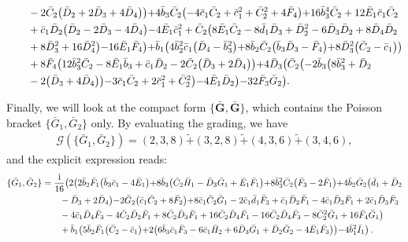 \documentclass[10pt]{amsart}
\theoremstyle{definition}
\theoremstyle{corollary}
\theoremstyle{remark}
\theoremstyle{conclusion}
\begin{document}
\begin{align}
& \hskip 0.7cm -2 \bar{C}_2 \bigl(\bar{D}_2+2 \bar{D}_3+4 \bar{D}_4\bigl)\bigl)+4 \bar{b}_3 \bar{C}_2 \bigl(-4 \bar{c}_1 \bar{C}_2+\bar{c}_1^2+\bar{C}_2^2+4 \bar{F}_4\bigl)+16 \bar{b}_3^4 \bar{C}_2+12 \bar{E}_1 \bar{c}_1 \bar{C}_2 \nonumber\\
& \hskip 0.7cm+\bar{c}_1 \bar{D}_2 \bigl(\bar{D}_2-2 \bar{D}_3-4 \bar{D}_4\bigl)-4 \bar{E}_1 \bar{c}_1^2+\bar{C}_2 \bigl(8 \bar{E}_1 \bar{C}_2-8 \bar{d}_1 \bar{D}_3+\bar{D}_2^2-6 \bar{D}_3 \bar{D}_2+8 \bar{D}_4 \bar{D}_2 \nonumber\\
& \hskip 0.7cm+8 \bar{D}_3^2+16 \bar{D}_4^2\bigl)-16 \bar{E}_1 \bar{F}_4\bigl)+\bar{b}_1 \bigl(4 \bar{b}_2^2 \bar{c}_1 \bigl(\bar{D}_4-\bar{b}_3^2\bigl)+8 \bar{b}_2 \bar{C}_2 \bigl(\bar{b}_3 \bar{D}_3-\bar{F}_4\bigl)+8 \bar{D}_3^2 \bigl(\bar{C}_2-\bar{c}_1\bigl)\bigl) \nonumber\\
& \hskip 0.7cm+8 \bar{F}_4 \bigl(12 \bar{b}_3^2 \bar{C}_2-8 \bar{E}_1 \bar{b}_3+\bar{c}_1 \bar{D}_2-2 \bar{C}_2 \bigl(\bar{D}_3+2 \bar{D}_4\bigl)\bigl)+4 \bar{D}_3 \bigl(\bar{C}_2 \bigl(-2 \bar{b}_3 \bigl(8 \bar{b}_3^2+\bar{D}_2  \nonumber\\
& \hskip 0.7cm-2 \bigl(\bar{D}_3+4 \bar{D}_4\bigl)\bigl)-3 \bar{c}_1\bar{C}_2+2 \bar{c}_1^2+\bar{C}_2^2\bigl)-4 \bar{E}_1 \bar{D}_2\bigl)-32 \bar{F}_3 \bar{G}_2\bigl) .
\end{align}


Finally, we will look at the compact form $\{\bar{\textbf{G}},\bar{\textbf{G}}\}$, which contains the Poisson bracket $\{\bar{G}_1,\bar{G}_2\}$ only. By evaluating the grading, we have
 \begin{align*}
    \mathcal{G} \left(\{\bar{G}_1,\bar{G}_2\}\right) = (2,3,8) \tilde{+}(3,2,8) \tilde{+}(4,3,6) \tilde{+}(3,4,6) ,
\end{align*} 
 and the explicit expression reads:
\begin{align}
\{\bar{G}_1,\bar{G}_2\}&=\frac{{\rm i}}{16}  \bigl(2 \bigl(2 \bar{b}_2 \bar{F}_1 \bigl(\bar{b}_3 \bar{c}_1-4 \bar{E}_1\bigl)+8 \bar{b}_3 \bigl(\bar{C}_2 \bar{H}_1-\bar{D}_3 \bar{G}_1+\bar{E}_1 \bar{F}_1\bigl)+8 \bar{b}_3^2 \bar{C}_2 \bigl(\bar{F}_3-2 \bar{F}_1\bigl)+4 \bar{b}_2 \bar{G}_2 \bigl(\bar{d}_1+\bar{D}_2 \nonumber \\
& \hskip 0.7cm-\bar{D}_3+2 \bar{D}_4\bigl)-2 \bar{G}_2 \bigl(\bar{c}_1 \bar{C}_2+8 \bar{F}_2\bigl)+8 \bar{c}_1 \bar{C}_2 \bar{G}_1-2 \bar{c}_1 \bar{d}_1 \bar{F}_3+\bar{c}_1 \bar{D}_2 \bar{F}_1-4 \bar{c}_1 \bar{D}_3 \bar{F}_1+2 \bar{c}_1 \bar{D}_3 \bar{F}_3 \nonumber \\
& \hskip 0.7cm-4 \bar{c}_1 \bar{D}_4 \bar{F}_3-4 \bar{C}_2 \bar{D}_2 \bar{F}_1+8 \bar{C}_2 \bar{D}_3 \bar{F}_1+16 \bar{C}_2 \bar{D}_4 \bar{F}_1-16 \bar{C}_2 \bar{D}_4 \bar{F}_3-8 \bar{C}_2^2 \bar{G}_1+16 \bar{F}_4 \bar{G}_1\bigl) \nonumber \\
& \hskip 0.7cm+\bar{b}_1 \bigl(5 \bar{b}_2 \bar{F}_1 \bigl(\bar{C}_2-\bar{c}_1\bigl)+2 \bigl(6 \bar{b}_3 \bar{c}_1 \bar{F}_3-6 \bar{c}_1 \bar{H}_2+6 \bar{D}_3 \bar{G}_1+\bar{D}_2 \bar{G}_2-4 \bar{E}_1 \bar{F}_3\bigl)\bigl)-4 \bar{b}_1^2 \bar{I}_1\bigl) \, .
\end{align}
\end{document}
